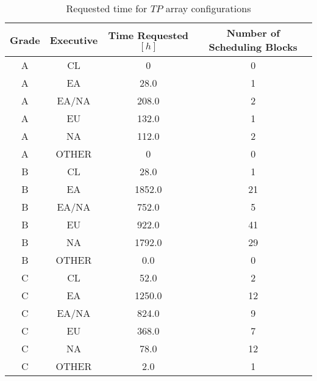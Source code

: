 \begin{table}
\begin{center}
\begin{tabular}{|c|c|c|c|}
\hline
\textbf{Grade} & \textbf{Executive} & \textbf{Time Requested $[h]$} & \textbf{Number of Scheduling Blocks} \\ \hline
A &	CL		& 0  & 0 \\ \hline
A &	EA		& 28.0  & 1 \\ \hline
A &	EA/NA	& 208.0   & 2 \\ \hline
A & EU      & 132.0 & 1 \\ \hline 
A &	NA		& 112.0 & 2 \\ \hline
A & OTHER	& 0		& 0 \\ \hline
B  & CL 	& 28.0		& 1  \\ \hline
B  & EA     & 1852.0     & 21 \\ \hline
B  & EA/NA  & 752.0     & 5  \\ \hline
B  & EU     & 922.0     & 41 \\ \hline
B  & NA     & 1792.0    & 29 \\ \hline
B  & OTHER  & 0.0      & 0  \\ \hline
C  & CL     & 52.0     & 2  \\ \hline
C  & EA     & 1250.0     & 12  \\ \hline
C  & EA/NA  & 824.0      & 9  \\ \hline
C  & EU     & 368.0     & 7 \\ \hline
C  & NA     & 78.0     & 12 \\ \hline
C  & OTHER  & 2.0      & 1  \\ \hline
\end{tabular}
\end{center}
\caption{Requested time for $TP$ array configurations}
\label{table:requested-time-tp}
\end{table}

